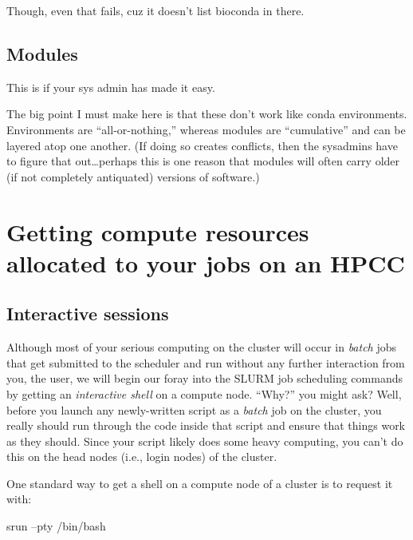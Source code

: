 \documentclass[]{krantz}
\makeatletter
\newenvironment{Shaded}{\begin{snugshade}}{\end{snugshade}}
\newcommand{\ExtensionTok}[1]{#1}
\newcommand{\NormalTok}[1]{#1}
\newenvironment{kframe}{%
\medskip{}
\setlength{\fboxsep}{.8em}
 \def\at@end@of@kframe{}%
 \ifinner\ifhmode%
  \def\at@end@of@kframe{\end{minipage}}%
  \begin{minipage}{\columnwidth}%
 \fi\fi%
 \def\FrameCommand##1{\hskip\@totalleftmargin \hskip-\fboxsep
 \colorbox{shadecolor}{##1}\hskip-\fboxsep
     \hskip-\linewidth \hskip-\@totalleftmargin \hskip\columnwidth}%
 \MakeFramed {\advance\hsize-\width
   \@totalleftmargin\z@ \linewidth\hsize
   \@setminipage}}%
 {\par\unskip\endMakeFramed%
 \at@end@of@kframe}
\renewenvironment{Shaded}{\begin{kframe}}{\end{kframe}}
\makeatother
\begin{document}
Though, even that fails, cuz it doesn't list bioconda in there.

\hypertarget{modules}{%
\subsection{Modules}\label{modules}}

This is if your sys admin has made it easy.

The big point I must make here is that these don't work like conda environments.
Environments are ``all-or-nothing,'' whereas modules are ``cumulative'' and can be
layered atop one another. (If doing so creates conflicts, then the sysadmins have to
figure that out\ldots{}perhaps this is one reason that modules will often carry older (if not
completely antiquated) versions of software.)

\hypertarget{getting-compute-resources-allocated-to-your-jobs-on-an-hpcc}{%
\section{Getting compute resources allocated to your jobs on an HPCC}\label{getting-compute-resources-allocated-to-your-jobs-on-an-hpcc}}

\hypertarget{interactive-sessions}{%
\subsection{Interactive sessions}\label{interactive-sessions}}

Although most of your serious computing on the cluster will occur in \emph{batch} jobs
that get submitted to the scheduler and run without any further interaction from you, the user,
we will begin our foray into the SLURM job scheduling commands by getting an \emph{interactive shell}
on a compute node. ``Why?'' you might ask? Well, before you launch any newly-written
script as a \emph{batch} job
on the cluster, you really should run through the code inside that script and ensure that
things work as they should. Since your script likely does some heavy computing, you can't do this on the
head nodes (i.e., login nodes) of the cluster.

One standard way to get a shell on a compute node of a cluster is to request it with:

\begin{Shaded}
\begin{Highlighting}[]
\ExtensionTok{srun}\NormalTok{ --pty /bin/bash}
\end{Highlighting}
\end{Shaded}
\end{document}
